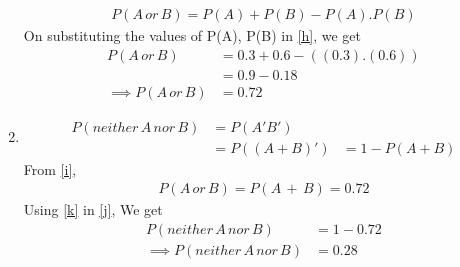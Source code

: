 \documentclass[journal,12pt,twocolumn]{IEEEtran}
\begin{document}
\begin{enumerate}[label={\roman*)}]
\begin{align}
    P(A\,or\,B) = P(A) + P(B) - P(A).P(B)\label{h}
\end{align}
On substituting the values of P(A), P(B) in \eqref{h}, we get
\begin{align}
    P(A\,or\,B) &= 0.3 + 0.6 -((0.3).(0.6))\\
    &= 0.9-0.18\\
    \implies P(A\,or\,B) &= 0.72\label{i}
\end{align}
\item
\begin{align}
    P(neither\, A\, nor\, B) &= P(A'B')\\
    &=P((A+B)')
    &=1-P(A+B)\label{j}
\end{align}
From \eqref{i},
\begin{align}
    P(A\,or\,B) =P(A\,+\,B)=0.72\label{k}
\end{align}
Using \eqref{k} in \eqref{j}, We get
\begin{align}
    P(neither\, A\, nor\, B)&=1-0.72\\
   \implies P(neither\, A\, nor\, B)&=0.28
\end{align}
\end{enumerate}
\end{document}
